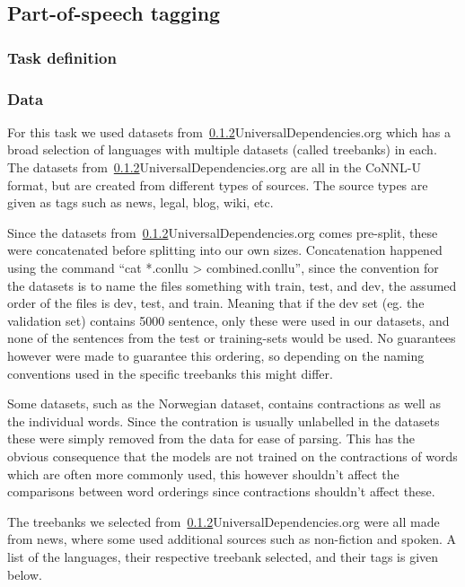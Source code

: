 
\subsection{Part-of-speech tagging}


\subsubsection{Task definition}


\subsubsection{Data}

For this task we used datasets from~\ref{}{UniversalDependencies.org} which has
a broad selection of languages with multiple datasets (called treebanks) in
each. The datasets from~\ref{}{UniversalDependencies.org} are all in the CoNNL-U
format, but are created from different types of sources. The source types are
given as tags such as news, legal, blog, wiki, etc.

Since the datasets from~\ref{}{UniversalDependencies.org} comes pre-split, these
were concatenated before splitting into our own sizes. Concatenation happened
using the command ``cat *.conllu > combined.conllu'', since the convention for
the datasets is to name the files something with train, test, and dev, the
assumed order of the files is dev, test, and train. Meaning that if the dev set
(eg. the validation set) contains 5000 sentence, only these were used in our
datasets, and none of the sentences from the test or training-sets would be
used. No guarantees however were made to guarantee this ordering, so depending
on the naming conventions used in the specific treebanks this might differ.

Some datasets, such as the Norwegian dataset, contains contractions as well as
the individual words. Since the contration is usually unlabelled in the datasets
these were simply removed from the data for ease of parsing. This has the
obvious consequence that the models are not trained on the contractions of words
which are often more commonly used, this however shouldn't affect the
comparisons between word orderings since contractions shouldn't affect these.

The treebanks we selected from~\ref{}{UniversalDependencies.org} were all made
from news, where some used additional sources such as non-fiction and spoken. A
list of the languages, their respective treebank selected, and their tags is
given below.

